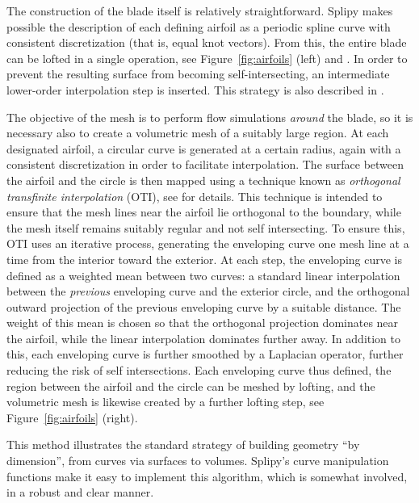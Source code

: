 \documentclass[preprint,12pt, a4paper]{elsarticle}
\begin{document}
The construction of the blade itself is relatively straightforward.
Splipy makes possible the description of each defining airfoil as a periodic spline curve with consistent discretization (that is, equal knot vectors).
From this, the entire blade can be lofted in a single operation, see Figure~\ref{fig:airfoils} (left) and \cite{Fonn2015sbm}.
In order to prevent the resulting surface from becoming self-intersecting, an intermediate lower-order interpolation step is inserted.
This strategy is also described in \cite{Fonn2015sbm}.

The objective of the mesh is to perform flow simulations \emph{around} the blade, so it is necessary also to create a volumetric mesh of a suitably large region.
At each designated airfoil, a circular curve is generated at a certain radius, again with a consistent discretization in order to facilitate interpolation.
The surface between the airfoil and the circle is then mapped using a technique known as \emph{orthogonal transfinite interpolation} (OTI), see \cite{Fonn2015sbm} for details.
This technique is intended to ensure that the mesh lines near the airfoil lie orthogonal to the boundary, while the mesh itself remains suitably regular and not self intersecting.
To ensure this, OTI uses an iterative process, generating the enveloping curve one mesh line at a time from the interior toward the exterior.
At each step, the enveloping curve is defined as a weighted mean between two curves: a standard linear interpolation between the \emph{previous} enveloping curve and the exterior circle, and the orthogonal outward projection of the previous enveloping curve by a suitable distance.
The weight of this mean is chosen so that the orthogonal projection dominates near the airfoil, while the linear interpolation dominates further away.
In addition to this, each enveloping curve is further smoothed by a Laplacian operator, further reducing the risk of self intersections.
Each enveloping curve thus defined, the region between the airfoil and the circle can be meshed by lofting, and the volumetric mesh is likewise created by a further lofting step, see Figure~\ref{fig:airfoils} (right).

This method illustrates the standard strategy of building geometry ``by dimension'', from curves via surfaces to volumes.
Splipy's curve manipulation functions make it easy to implement this algorithm, which is somewhat involved, in a robust and clear manner.
\end{document}
